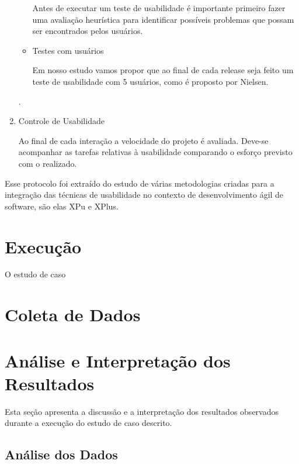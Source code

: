 \begin{enumerate}
\begin{itemize}
		Antes de executar um teste de usabilidade é importante primeiro fazer uma avaliação heurística para identificar possíveis problemas que possam ser encontrados pelos usuários.
		
		\item Testes com usuários
		
		Em nosso estudo vamos propor que ao final de cada release seja feito um teste de usabilidade com 5 usuários, como é proposto por Nielsen.
				
	\end{itemize} 
	.
	
\item Controle de Usabilidade
	
	Ao final de cada interação a velocidade do projeto é avaliada. Deve-se acompanhar as tarefas relativas à usabilidade comparando o esforço previsto com o realizado.
	
\end{enumerate}
Esse protocolo foi extraído do estudo de várias metodologias criadas para a integração das técnicas de usabilidade no contexto de desenvolvimento ágil de software, são elas XPu e XPlus.
 
 
 
\section{Execução}


O estudo de caso

\section{Coleta de Dados}

\section{Análise e Interpretação dos Resultados}

Esta seção apresenta a discussão e a interpretação dos resultados observados durante a execução do estudo de caso descrito.

\subsection{Análise dos Dados}

